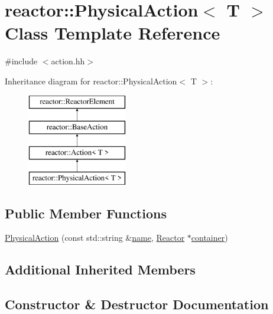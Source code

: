 \hypertarget{classreactor_1_1PhysicalAction}{}\section{reactor\+:\+:Physical\+Action$<$ T $>$ Class Template Reference}
\label{classreactor_1_1PhysicalAction}


{\ttfamily \#include $<$action.\+hh$>$}

Inheritance diagram for reactor\+:\+:Physical\+Action$<$ T $>$\+:\begin{figure}[H]
\begin{center}
\leavevmode
\includegraphics[height=4.000000cm]{classreactor_1_1PhysicalAction}
\end{center}
\end{figure}
\subsection*{Public Member Functions}
\begin{DoxyCompactItemize}
\item 
\hyperlink{classreactor_1_1PhysicalAction_a8b8b1c1b6c701f1cc60254e65e059ec0}{Physical\+Action} (const std\+::string \&\hyperlink{classreactor_1_1ReactorElement_a99579f61dbaf5d5d98aebfe26eb8bf77}{name}, \hyperlink{classreactor_1_1Reactor}{Reactor} $\ast$\hyperlink{classreactor_1_1ReactorElement_a25bf298de879a82eefc1ba426be05812}{container})
\end{DoxyCompactItemize}
\subsection*{Additional Inherited Members}


\subsection{Constructor \& Destructor Documentation}
\mbox{\label{classreactor_1_1PhysicalAction_a8b8b1c1b6c701f1cc60254e65e059ec0}} 
